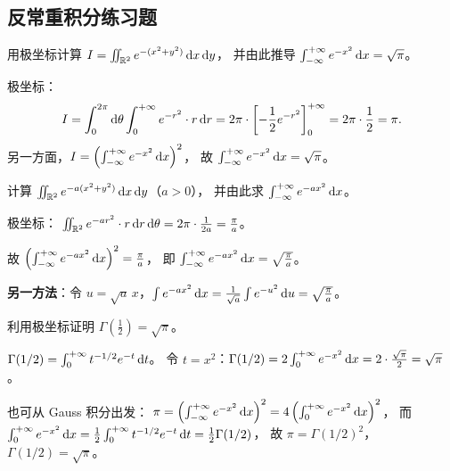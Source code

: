 \documentclass{ctexart}
\begin{document}
\subsection{反常重积分练习题}

\begin{exercise}[$n$ 维 Gauss 积分]
  用极坐标计算 $I = \iint_{\mathbb{R}^2} e^{-(x^2+y^2)} \,\mathrm{d} x\,\mathrm{d} y$，
  并由此推导 $\int_{-\infty}^{+\infty} e^{-x^2} \,\mathrm{d} x = \sqrt{\pi}$。
\end{exercise}

\begin{solution}
  极坐标：
  \[
    I = \int_0^{2\pi} \mathrm{d} \theta \int_0^{+\infty} e^{-r^2} \cdot r \,\mathrm{d} r
    = 2\pi \cdot \left[-\frac{1}{2}e^{-r^2}\right]_0^{+\infty}
    = 2\pi \cdot \frac{1}{2} = \pi.
  \]
  另一方面，$I = \left(\int_{-\infty}^{+\infty} e^{-x^2}\,\mathrm{d} x\right)^2$，
  故 $\int_{-\infty}^{+\infty} e^{-x^2} \,\mathrm{d} x = \sqrt{\pi}$。
\end{solution}

\begin{exercise}
  计算 $\iint_{\mathbb{R}^2} e^{-a(x^2+y^2)} \,\mathrm{d} x\,\mathrm{d} y$（$a > 0$），
  并由此求 $\int_{-\infty}^{+\infty} e^{-ax^2} \,\mathrm{d} x$。
\end{exercise}

\begin{solution}
  极坐标：
  $\iint_{\mathbb{R}^2} e^{-ar^2} \cdot r \,\mathrm{d} r\,\mathrm{d} \theta
  = 2\pi \cdot \frac{1}{2a} = \frac{\pi}{a}$。

  故 $\left(\int_{-\infty}^{+\infty} e^{-ax^2}\,\mathrm{d} x\right)^2 = \frac{\pi}{a}$，
  即 $\int_{-\infty}^{+\infty} e^{-ax^2}\,\mathrm{d} x = \sqrt{\frac{\pi}{a}}$。

  \textbf{另一方法}：令 $u = \sqrt{a}\,x$，$\int e^{-ax^2}\,\mathrm{d} x = \frac{1}{\sqrt{a}}\int e^{-u^2}\,\mathrm{d} u = \sqrt{\frac{\pi}{a}}$。
\end{solution}

\begin{exercise}
  利用极坐标证明 $\Gamma\!\left(\frac{1}{2}\right) = \sqrt{\pi}$。
\end{exercise}

\begin{solution}
  $\Gamma(1/2) = \int_0^{+\infty} t^{-1/2} e^{-t} \,\mathrm{d} t$。
  令 $t = x^2$：$\Gamma(1/2) = 2\int_0^{+\infty} e^{-x^2}\,\mathrm{d} x = 2 \cdot \frac{\sqrt{\pi}}{2} = \sqrt{\pi}$。

  也可从 Gauss 积分出发：
  $\pi = \left(\int_{-\infty}^{+\infty} e^{-x^2}\,\mathrm{d} x\right)^2
  = 4\left(\int_0^{+\infty} e^{-x^2}\,\mathrm{d} x\right)^2$，
  而 $\int_0^{+\infty} e^{-x^2}\,\mathrm{d} x
  = \frac{1}{2}\int_0^{+\infty} t^{-1/2}e^{-t}\,\mathrm{d} t = \frac{1}{2}\Gamma(1/2)$，
  故 $\pi = \Gamma(1/2)^2$，$\Gamma(1/2) = \sqrt{\pi}$。
\end{solution}
\end{document}
